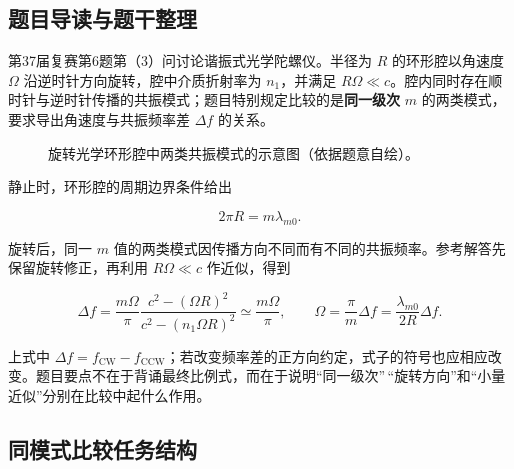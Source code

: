 \documentclass[
  12pt,
  a4paper,twoside,openany]{ctexbook}
\begin{document}
\subsection{题目导读与题干整理}\label{ux9898ux76eeux5bfcux8bfbux4e0eux9898ux5e72ux6574ux7406-3}

第37届复赛第6题第（3）问讨论谐振式光学陀螺仪。半径为 \(R\)
的环形腔以角速度 \(\Omega\) 沿逆时针方向旋转，腔中介质折射率为
\(n_1\)，并满足
\(R\Omega\ll c\)。腔内同时存在顺时针与逆时针传播的共振模式；题目特别规定比较的是\textbf{同一级次}
\(m\) 的两类模式，要求导出角速度与共振频率差 \(\Delta f\) 的关系。

\begin{figure}[H]
\centering
{}
\caption{旋转光学环形腔中两类共振模式的示意图（依据题意自绘）。}
\end{figure}

静止时，环形腔的周期边界条件给出

\[
2\pi R=m\lambda_{m0}.
\]

旋转后，同一 \(m\)
值的两类模式因传播方向不同而有不同的共振频率。参考解答先保留旋转修正，再利用
\(R\Omega\ll c\) 作近似，得到

\[
\Delta f
=\frac{m\Omega}{\pi}
 \frac{c^2-(\Omega R)^2}{c^2-(n_1\Omega R)^2}
\simeq\frac{m\Omega}{\pi},
\qquad
\Omega=\frac{\pi}{m}\Delta f
=\frac{\lambda_{m0}}{2R}\Delta f .
\]

上式中
\(\Delta f=f_{\mathrm{CW}}-f_{\mathrm{CCW}}\)；若改变频率差的正方向约定，式子的符号也应相应改变。题目要点不在于背诵最终比例式，而在于说明``同一级次''\,``旋转方向''和``小量近似''分别在比较中起什么作用。

\subsection{同模式比较任务结构}\label{ux540cux6a21ux5f0fux6bd4ux8f83ux4efbux52a1ux7ed3ux6784}
\end{document}
